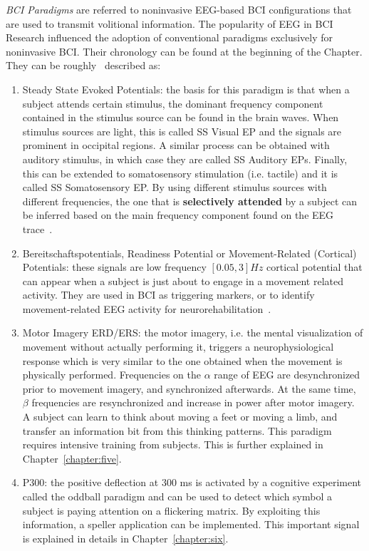 \textit{BCI Paradigms} are referred to noninvasive EEG-based BCI configurations that are used to transmit volitional information.  The popularity of EEG in BCI Research influenced the adoption of conventional paradigms exclusively for noninvasive BCI.   Their chronology can be found at the beginning of the Chapter. They can be roughly~\cite{Chaudhary2016} described as:

\begin{enumerate}
\item Steady State Evoked Potentials: the basis for this paradigm is that when a subject attends certain stimulus, the dominant frequency component contained in the stimulus source can be found in the brain waves.  When stimulus sources are light, this is called SS Visual EP and the signals are prominent in occipital regions.  A similar process can be obtained with auditory stimulus, in which case they are called SS Auditory EPs.  Finally, this can be extended to somatosensory stimulation (i.e. tactile) and it is called SS Somatosensory EP.  By using different stimulus sources with different frequencies, the one that is \textbf{selectively attended} by a subject can be inferred based on the main frequency component found on the EEG trace~\cite{Nam2010}.
\item Bereitschaftspotentials, Readiness Potential or Movement-Related (Cortical) Potentials: these signals are low frequency $\left[0.05, 3\right] \si{Hz}$ cortical potential that can appear when a subject is just about to engage in a movement related activity.  They are used in BCI as triggering markers, or to identify movement-related EEG activity for neurorehabilitation~\cite{c52}.
\item Motor Imagery ERD/ERS: the motor imagery, i.e. the mental visualization of movement without actually performing it, triggers a neurophysiological response which is very similar to the one obtained when the movement is physically performed. Frequencies on the $\alpha$ range of EEG are desynchronized prior to movement imagery, and synchronized afterwards. At the same time, $\beta$ frequencies are resynchronized and increase in power after motor imagery. A subject can learn to think about moving a feet or moving a limb, and transfer an information bit from this thinking patterns. This paradigm requires intensive training from subjects.  This is further explained in Chapter~\ref{chapter:five}.
\item P300: the positive deflection at 300 \si{\ms} is activated by a cognitive experiment called the oddball paradigm and can be used to detect which symbol a subject is paying attention on a flickering matrix.  By exploiting this information, a speller application can be implemented. This important signal is explained in details in Chapter~\ref{chapter:six}.

\end{enumerate}
